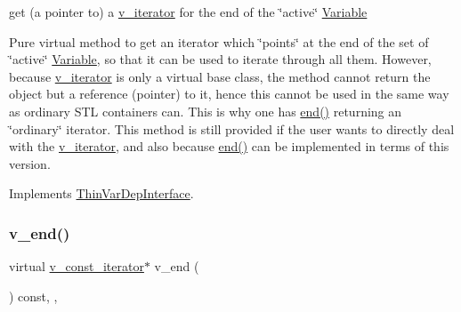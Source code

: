 get (a pointer to) a \mbox{\hyperlink{class_s_m_spp__di__unipi__it_1_1_one_var_constraint_1_1v__iterator}{v\+\_\+iterator}} for the end of the \char`\"{}active\char`\"{} \mbox{\hyperlink{class_s_m_spp__di__unipi__it_1_1_variable}{Variable}} 

Pure virtual method to get an iterator which \char`\"{}points\char`\"{} at the end of the set of \char`\"{}active\char`\"{} \mbox{\hyperlink{class_s_m_spp__di__unipi__it_1_1_variable}{Variable}}, so that it can be used to iterate through all them. However, because \mbox{\hyperlink{class_s_m_spp__di__unipi__it_1_1_one_var_constraint_1_1v__iterator}{v\+\_\+iterator}} is only a virtual base class, the method cannot return the object but a reference (pointer) to it, hence this cannot be used in the same way as ordinary S\+TL containers can. This is why one has \mbox{\hyperlink{group___thin_var_dep_interface___c_l_a_s_s_e_s_gae1175d5cbc6627e3e49ed9bcb58ffce9}{end()}} returning an \char`\"{}ordinary\char`\"{} iterator. This method is still provided if the user wants to directly deal with the \mbox{\hyperlink{class_s_m_spp__di__unipi__it_1_1_one_var_constraint_1_1v__iterator}{v\+\_\+iterator}}, and also because \mbox{\hyperlink{group___thin_var_dep_interface___c_l_a_s_s_e_s_gae1175d5cbc6627e3e49ed9bcb58ffce9}{end()}} can be implemented in terms of this version. 

Implements \mbox{\hyperlink{group___thin_var_dep_interface___c_l_a_s_s_e_s_ga422dd4393326b2da21dbef0aa0a85bee}{Thin\+Var\+Dep\+Interface}}.

\mbox{\label{class_s_m_spp__di__unipi__it_1_1_one_var_constraint_a17969277c912e791df025c9bebda3217}} 
\subsubsection{\texorpdfstring{v\+\_\+end()}{v\_end()}\hspace{0.1cm}{\footnotesize\ttfamily [2/2]}}
{\footnotesize\ttfamily virtual \mbox{\hyperlink{class_s_m_spp__di__unipi__it_1_1_one_var_constraint_1_1v__const__iterator}{v\+\_\+const\+\_\+iterator}}$\ast$ v\+\_\+end (\begin{DoxyParamCaption}\item[{void}]{ }\end{DoxyParamCaption}) const\hspace{0.3cm}{\ttfamily [inline]}, {\ttfamily [override]}, {\ttfamily [virtual]}}



